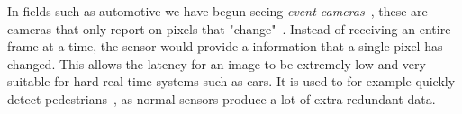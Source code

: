 In fields such as automotive we have begun seeing \textit{event cameras}~\cite{shariff2024event},
these are cameras that only report on pixels that "change"~\cite{rebecq2019events}.
Instead of receiving an entire frame at a time, the sensor would provide a
information that a single pixel  has changed. This allows the latency for
an image to be extremely low and very suitable for hard real time systems such
as cars. It is used to for example quickly detect pedestrians~\cite{wang2024research},
as normal sensors produce a lot of extra redundant data.
